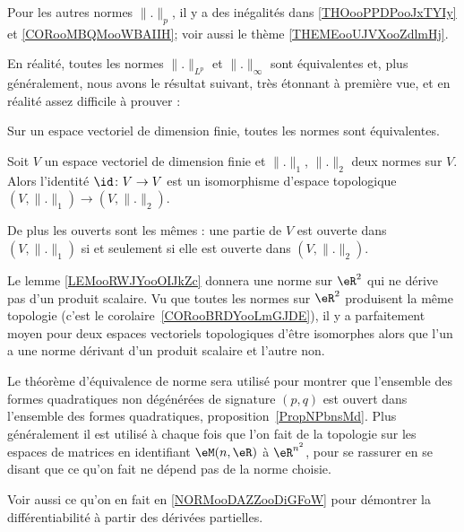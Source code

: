Pour les autres normes \( \| . \|_p\), il y a des inégalités dans \ref{THOooPPDPooJxTYIy} et \ref{CORooMBQMooWBAIIH}; voir aussi le thème \ref{THEMEooUJVXooZdlmHj}.

En réalité, toutes les normes \( \| . \|_{L^p}\) et \( \| . \|_{\infty}\) sont équivalentes et, plus généralement, nous avons le résultat suivant, très étonnant à première vue, et en réalité assez difficile à prouver :
\begin{theorem}		\label{ThoNormesEquiv}
	Sur un espace vectoriel de dimension finie, toutes les normes sont équivalentes.
\end{theorem}

\begin{corollary}       \label{CORooBRDYooLmGJDE}
    Soit \( V\) un espace vectoriel de dimension finie et \( \| . \|_1\), \( \| . \|_2\) deux normes sur \( V\). Alors l'identité \( \id\colon V\to V\) est un isomorphisme d'espace topologique \( (V,\| . \|_1)\to (V,\| . \|_2)\).

    De plus les ouverts sont les mêmes : une partie de \( V\) est ouverte dans \( (V,\| . \|_1)\) si et seulement si elle est ouverte dans \( (V,\| . \|_2)\).
\end{corollary}

\begin{normaltext}      \label{NORMooNKBCooKziIjx}
    Le lemme \ref{LEMooRWJYooOIJkZc} donnera une norme sur \( \eR^2\) qui ne dérive pas d'un produit scalaire. Vu que toutes les normes sur \( \eR^2\) produisent la même topologie (c'est le corolaire~\ref{CORooBRDYooLmGJDE}), il y a parfaitement moyen pour deux espaces vectoriels topologiques d'être isomorphes alors que l'un a une norme dérivant d'un produit scalaire et l'autre non.
\end{normaltext}

\begin{normaltext}
    Le théorème d'équivalence de norme sera utilisé pour montrer que l'ensemble des formes quadratiques non dégénérées de signature \( (p,q)\) est ouvert dans l'ensemble des formes quadratiques, proposition~\ref{PropNPbnsMd}. Plus généralement il est utilisé à chaque fois que l'on fait de la topologie sur les espaces de matrices en identifiant \( \eM(n,\eR)\) à \( \eR^{n^2}\), pour se rassurer en se disant que ce qu'on fait ne dépend pas de la norme choisie.

    Voir aussi ce qu'on en fait en \ref{NORMooDAZZooDiGFoW} pour démontrer la différentiabilité à partir des dérivées partielles.
\end{normaltext}


